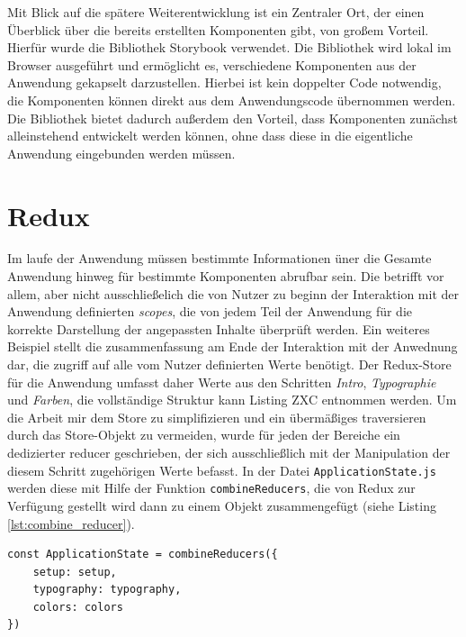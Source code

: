 Mit Blick auf die spätere Weiterentwicklung ist ein Zentraler Ort, der einen Überblick über die bereits erstellten Komponenten gibt, von großem Vorteil.
Hierfür wurde die Bibliothek Storybook\footnotemark{} verwendet. Die Bibliothek wird lokal im Browser ausgeführt und ermöglicht es, verschiedene Komponenten aus der Anwendung gekapselt darzustellen. Hierbei ist kein doppelter Code notwendig, die Komponenten können direkt aus dem Anwendungscode übernommen werden.
Die Bibliothek bietet dadurch außerdem den Vorteil, dass Komponenten zunächst alleinstehend entwickelt werden können, ohne dass diese in die eigentliche Anwendung eingebunden werden müssen.


\section{Redux}
\label{chap:redux}

Im laufe der Anwendung müssen bestimmte Informationen üner die Gesamte Anwendung hinweg für bestimmte Komponenten abrufbar sein. Die betrifft vor allem, aber nicht ausschließelich die von Nutzer zu beginn der Interaktion mit der Anwendung definierten \textit{scopes}, die von jedem Teil der Anwendung für die korrekte Darstellung der angepassten Inhalte überprüft werden. Ein weiteres Beispiel stellt die zusammenfassung am Ende der Interaktion mit der Anwednung dar, die zugriff auf alle vom Nutzer definierten Werte benötigt. Der Redux-Store für die Anwendung umfasst daher Werte aus den Schritten \textit{Intro}, \textit{Typographie} und \textit{Farben}, die vollständige Struktur kann Listing ZXC entnommen werden.
Um die Arbeit mir dem Store zu simplifizieren und ein übermäßiges traversieren durch das Store-Objekt zu vermeiden, wurde für jeden der Bereiche ein dedizierter reducer geschrieben, der sich ausschließlich mit der Manipulation der diesem Schritt zugehörigen Werte befasst. In der Datei \verb|ApplicationState.js| werden diese mit Hilfe der Funktion \verb|combineReducers|, die von Redux zur Verfügung gestellt wird dann zu einem Objekt zusammengefügt (siehe Listing \ref{lst:combine_reducer}).

\begin{lstlisting}[caption={Zusammenfügen der dedizierten Reducer zu einem Objekt}, label=lst:combine_reducer]
  const ApplicationState = combineReducers({
    setup: setup,
    typography: typography,
    colors: colors
})
\end{lstlisting}

